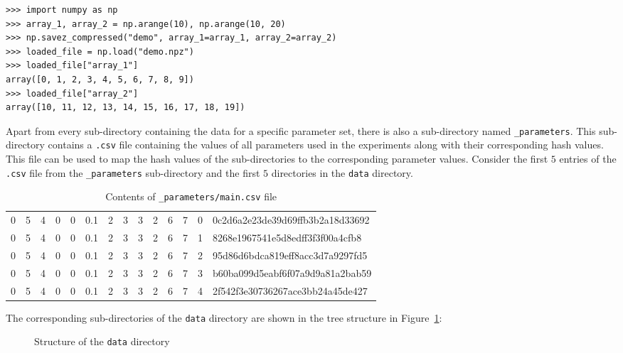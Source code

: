 \begin{lstlisting}[style=pystyle]
>>> import numpy as np
>>> array_1, array_2 = np.arange(10), np.arange(10, 20)
>>> np.savez_compressed("demo", array_1=array_1, array_2=array_2)
>>> loaded_file = np.load("demo.npz")
>>> loaded_file["array_1"]
array([0, 1, 2, 3, 4, 5, 6, 7, 8, 9])
>>> loaded_file["array_2"]
array([10, 11, 12, 13, 14, 15, 16, 17, 18, 19])

\end{lstlisting}

Apart from every sub-directory containing the data for a specific parameter set,
there is also a sub-directory named \lstinline{_parameters}.
This sub-directory contains a \lstinline{.csv} file containing the
values of all parameters used in the experiments along with their corresponding
hash values.
This file can be used to map the hash values of the sub-directories to the
corresponding parameter values.
Consider the first \(5\) entries of the \lstinline{.csv} file
from the \lstinline{_parameters} sub-directory and the first
\(5\) directories in the \lstinline{data} directory.

\begin{table}[H]
    \centering
    \caption{Contents of \lstinline{_parameters/main.csv} file}
    \begin{tabular}{|cccccccccccccl|}
        \hline
        0 & 5 & 4 & 0 & 0 & 0.1 & 2 & 3 & 3 & 2 & 6 & 7 & 0 &
        0c2d6a2e23de39d69ffb3b2a18d33692 \\
        0 & 5 & 4 & 0 & 0 & 0.1 & 2 & 3 & 3 & 2 & 6 & 7 & 1 &
        8268e1967541e5d8edff3f3f00a4cfb8 \\
        0 & 5 & 4 & 0 & 0 & 0.1 & 2 & 3 & 3 & 2 & 6 & 7 & 2 &
        95d86d6bdca819eff8acc3d7a9297fd5 \\
        0 & 5 & 4 & 0 & 0 & 0.1 & 2 & 3 & 3 & 2 & 6 & 7 & 3 &
        b60ba099d5eabf6f07a9d9a81a2bab59 \\
        0 & 5 & 4 & 0 & 0 & 0.1 & 2 & 3 & 3 & 2 & 6 & 7 & 4 &
        2f542f3e30736267ace3bb24a45de427 \\
        \hline
    \end{tabular}
    \label{tab:parameters_csv}
\end{table}

The corresponding sub-directories of the \lstinline{data}
directory are shown in the tree structure in Figure~\ref{fig:data_directory}:

\begin{figure}[H]
    \caption{Structure of the \lstinline{data} directory}
    \label{fig:data_directory}
\end{figure}
    
